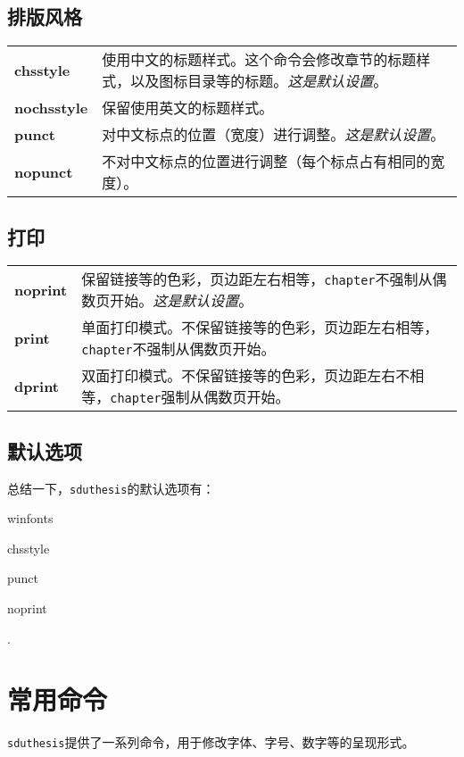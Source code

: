 \section{排版风格}
\begin{center}
\begin{tabular}{p{}p{}}
\toprule
\textbf{chsstyle}& 使用中文的标题样式。这个命令会修改章节的标题样式，以及图标目录等的标题。\textit{这是默认设置}。\\
\textbf{nochsstyle}& 保留使用英文的标题样式。\\
\textbf{punct}& 对中文标点的位置（宽度）进行调整。\textit{这是默认设置}。\\
\textbf{nopunct}& 不对中文标点的位置进行调整（每个标点占有相同的宽度）。\\
\bottomrule
\end{tabular}
\end{center}
\section{打印}
\begin{center}
\begin{tabular}{p{}p{}}
\toprule
\textbf{noprint}& 保留链接等的色彩，页边距左右相等，\verb|chapter|不强制从偶数页开始。\textit{这是默认设置}。\\
\textbf{print}& 单面打印模式。不保留链接等的色彩，页边距左右相等，\verb|chapter|不强制从偶数页开始。\\
\textbf{dprint}& 双面打印模式。不保留链接等的色彩，页边距左右不相等，\verb|chapter|强制从偶数页开始。\\
\bottomrule
\end{tabular}
\end{center}
\section{默认选项}
总结一下，\verb|sduthesis|的默认选项有：\begin{inparaitem}
\item winfonts\item chsstyle\item punct\item noprint
\end{inparaitem}.
\chapter{常用命令}
\verb|sduthesis|提供了一系列命令，用于修改字体、字号、数字等的呈现形式。

